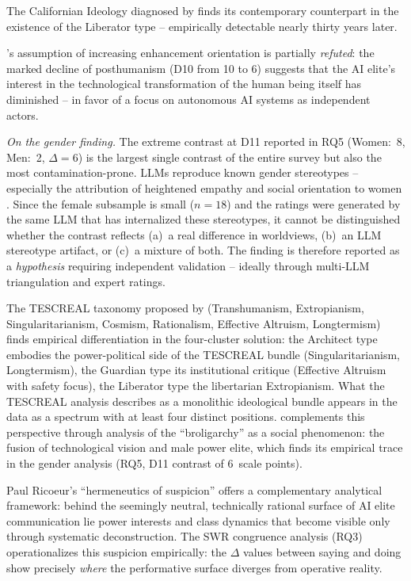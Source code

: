 \documentclass[12pt,a4paper]{article}
\begin{document}
The Californian Ideology diagnosed by \citet{BarbCam1996} finds its contemporary counterpart in the existence of the Liberator type -- empirically detectable nearly thirty years later.

\citeauthor{Coeckelbergh2020}'s assumption of increasing enhancement orientation is partially \emph{refuted}: the marked decline of posthumanism (D10 from 10 to 6) suggests that the AI elite's interest in the technological transformation of the human being itself has diminished -- in favor of a focus on autonomous AI systems as independent actors.

\emph{On the gender finding.} The extreme contrast at D11 reported in RQ5 (Women:~8, Men:~2, $\Delta = 6$) is the largest single contrast of the entire survey but also the most contamination-prone. LLMs reproduce known gender stereotypes -- especially the attribution of heightened empathy and social orientation to women \citep{Santurkar2023}. Since the female subsample is small ($n = 18$) and the ratings were generated by the same LLM that has internalized these stereotypes, it cannot be distinguished whether the contrast reflects (a)~a real difference in worldviews, (b)~an LLM stereotype artifact, or (c)~a mixture of both. The finding is therefore reported as a \emph{hypothesis} requiring independent validation -- ideally through multi-LLM triangulation and expert ratings.

The TESCREAL taxonomy proposed by \citet{TorresGebru2024} (Transhumanism, Extropianism, Singularitarianism, Cosmism, Rationalism, Effective Altruism, Longtermism) finds empirical differentiation in the four-cluster solution: the Architect type embodies the power-political side of the TESCREAL bundle (Singularitarianism, Longtermism), the Guardian type its institutional critique (Effective Altruism with safety focus), the Liberator type the libertarian Extropianism. What the TESCREAL analysis describes as a monolithic ideological bundle appears in the data as a spectrum with at least four distinct positions. \citet{Becker2025} complements this perspective through analysis of the ``broligarchy'' as a social phenomenon: the fusion of technological vision and male power elite, which finds its empirical trace in the gender analysis (RQ5, D11 contrast of 6~scale points).

Paul Ricoeur's ``hermeneutics of suspicion'' \citep{Ricoeur1970} offers a complementary analytical framework: behind the seemingly neutral, technically rational surface of AI elite communication lie power interests and class dynamics that become visible only through systematic deconstruction. The SWR congruence analysis (RQ3) operationalizes this suspicion empirically: the $\Delta$ values between saying and doing show precisely \emph{where} the performative surface diverges from operative reality.
\end{document}
